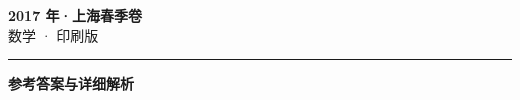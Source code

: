 \documentclass[zihao=5, a4paper]{ctexart}
\begin{document}
\begin{center}
  {\Large\bfseries 2017 年·上海春季卷}\\[4pt]
  {\large 数学 · 印刷版}
\end{center}
\medskip
{}

\par\bigskip\hrule\bigskip
{}
\begin{center}{\large\bfseries 参考答案与详细解析}\end{center}
\smallskip

\end{document}
